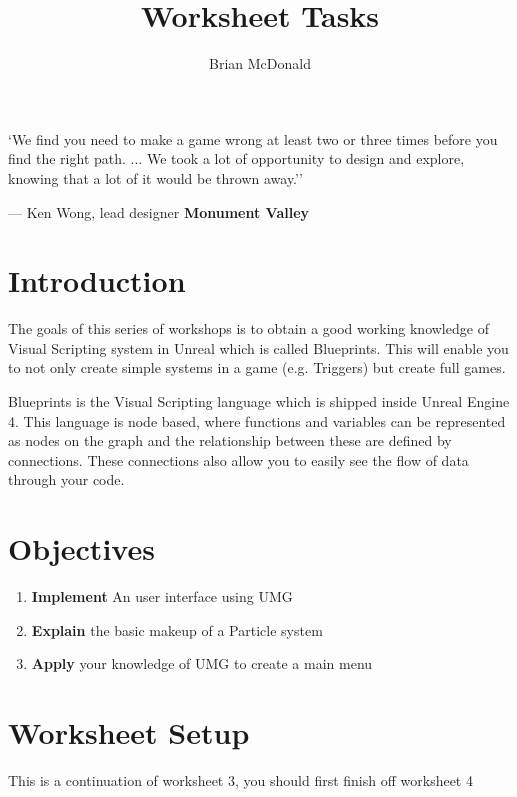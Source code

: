 \documentclass{../../../fal_assignment}
\title{Worksheet Tasks}
\author{Brian McDonald} %
\begin{document}
\maketitle

\begin{marginquote}
`We find you need to make a game wrong at least two or three times before you find the right path. ...
We took a lot of opportunity to design and explore, knowing that a lot of it would be thrown away.''
\par --- Ken Wong, lead designer \textbf{Monument Valley}
\end{marginquote}


\section*{Introduction}
The goals of this series of workshops is to obtain a good working knowledge of Visual Scripting system in Unreal which is called Blueprints. This will enable you to not only create simple systems in a game (e.g. Triggers) but create full games.

Blueprints is the Visual Scripting language which is shipped inside Unreal Engine 4. This language is node based, where functions and variables can be represented as nodes on the graph and the relationship between these are defined by connections. These connections also allow you to easily see the flow of data through your code.

\section*{Objectives}
\begin{enumerate}[label=(\Alph*)]
	\item \textbf{Implement} An user interface using UMG
  \item \textbf{Explain} the basic makeup of a Particle system
  \item \textbf{Apply} your knowledge of UMG to create a main menu
\end{enumerate}

\section*{Worksheet Setup}

This is a continuation of worksheet 3, you should first finish off worksheet 4
\end{document}
